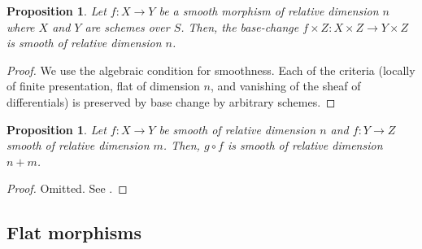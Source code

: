 \documentclass{amsart}
\DeclareMathOperator{\Spec}{Spec}
\newtheorem{proposition}[theorem]{Proposition}
\theoremstyle{definition}
\theoremstyle{remark}
\newcommand\restr[2]{{%
  \left.\kern-\nulldelimiterspace %
  #1 %
  \vphantom{|} %
  \right|_{#2} %
  }}
\begin{document}
\begin{proposition}
    Let $f : X \to Y$ be a smooth morphism of relative dimension $n$ where $X$
    and $Y$ are schemes over $S$. Then, the base-change $f \times Z : X \times Z
    \to Y \times Z$ is smooth of relative dimension $n$.
\end{proposition}

\begin{proof}
    We use the algebraic condition for smoothness. Each of the criteria (locally
    of finite presentation, flat of dimension $n$, and vanishing of the sheaf of
    differentials) is preserved by base change by arbitrary schemes.
\end{proof}

\begin{proposition}
    Let $f : X \to Y$ be smooth of relative dimension $n$ and $f : Y \to Z$
    smooth of relative dimension $m$. Then, $g \circ f$ is smooth of relative
    dimension $n + m$.
\end{proposition}

\begin{proof}
    Omitted. See \cite{vakil}.
    \iffalse
    The question is local, so we write $X = \Spec(A)$, $Y = \Spec(B)$, and $Z =
    \Spec(C)$. Consider the following diagram
    \[
        \begin{tikzcd}
            \Spec(A) \ar[r, "\sim"] \ar[d, "f"] &
            W_B \ar[d, "\restr{\rho_B}{W_B}"] \\
            \Spec(B) \ar[r, "\text{id}"] \ar[d, "\text{id}"] &
            \Spec(B) \ar[d, "\rotatebox{90}{$\sim$}"] \\
            \Spec(B) \ar[r, "\sim"] \ar[d, "g"] &
            W_C \ar[d, "\restr{\rho_C}{W_C}"] \\
            \Spec(C) \ar[r, "\text{id}"] &
            \Spec(C)
        \end{tikzcd}
    \]
    The upper and lower squares commute by hypothesis. The middle row commutes
    by construction. The outer rectangle is the desired commutative square in
    the definition of smoothness. To show the smoothness of $f \circ g$ is of
    relative dimension $n + m$, we observe that the map $\rho_B \circ \rho_C$ is
    induced by successive inclusions of coordinate rings $C \xhookrightarrow{}
    C[x_1, \dots, x_{m + s}]/(f_1, \dots, f_s)$ and $B \xhookrightarrow{} B[y_1,
    \dots, y_{n + r}]/(g_1, \dots, g_r)$.
    \fi
\end{proof}

\subsection{Flat morphisms}
\end{document}
